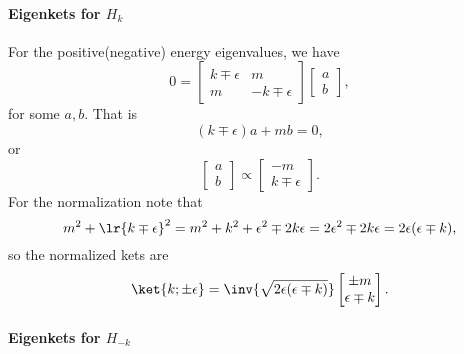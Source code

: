 \paragraph{Eigenkets for \( H_k \)}

For the positive(negative) energy eigenvalues, we have
%
\begin{dmath}\label{eqn:gradQuantumProblemSet4Problem3:140}
0
=
\begin{bmatrix}
k \mp \epsilon & m \\
m & -k \mp \epsilon
\end{bmatrix}
\begin{bmatrix}
a \\
b
\end{bmatrix},
\end{dmath}
%
for some \( a, b\).  That is
%
\begin{equation}\label{eqn:gradQuantumProblemSet4Problem3:160}
(k \mp \epsilon) a + m b = 0,
\end{equation}
%
or
%
\begin{dmath}\label{eqn:gradQuantumProblemSet4Problem3:180}
\begin{bmatrix}
a \\
b
\end{bmatrix}
\propto
\begin{bmatrix}
- m \\
k \mp \epsilon
\end{bmatrix}.
\end{dmath}
%
For the normalization note that
%
\begin{dmath}\label{eqn:gradQuantumProblemSet4Problem3:200}
m^2 + \lr{ k \mp \epsilon }^2
=
m^2 + k^2 + \epsilon^2 \mp 2 k \epsilon
=
2 \epsilon^2 \mp 2 k \epsilon
=
2 \epsilon (\epsilon \mp k),
\end{dmath}
%
so the normalized kets are
%
\begin{dmath}\label{eqn:gradQuantumProblemSet4Problem3:220}
\ket{k; \pm\epsilon} =
\inv{\sqrt{2 \epsilon(\epsilon \mp k)}}
\begin{bmatrix}
\pm m \\
\epsilon \mp k
\end{bmatrix}.
\end{dmath}
%
\paragraph{Eigenkets for \( H_{-k} \)}

